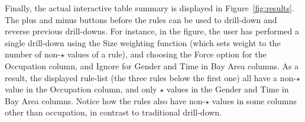 Finally, the actual interactive table summary is displayed in Figure~\ref{fig:results}. The plus and minus buttons before the rules can be used to drill-down and reverse previous drill-downs. For instance, in the figure, the user has performed a single drill-down using the Size weighting function (which sets weight to the number of non-$\star$ values of a rule), and choosing the Force option for the Occupation column, and Ignore for Gender and Time in Bay Area columns. As a result, the displayed rule-list (the three rules below the first one) all have a non-$\star$ value in the Occupation column, and only $\star$ values in the Gender and Time in Bay Area columns. Notice how the rules also have non-$\star$ values in some columns other than occupation, in contrast to traditional drill-down.